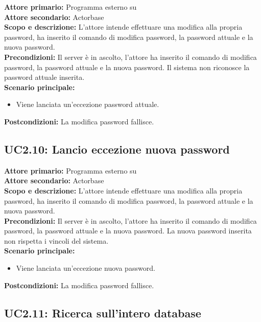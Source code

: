 \documentclass{scalatekids-article}
\begin{document}
\textbf{Attore primario:} Programma esterno su \\
\textbf{Attore secondario:} Actorbase\\
\textbf{Scopo e descrizione:}
L'attore intende effettuare una modifica alla propria password, ha inserito il comando di modifica password, la password attuale e la nuova password.\\
\textbf{Precondizioni:} Il server è in ascolto, l'attore ha inserito il comando di modifica password, la password attuale e la nuova password. Il sistema non riconosce la password attuale inserita.\\
\textbf{Scenario principale:}
\begin{itemize}
\item Viene lanciata un'eccezione password attuale.
\end{itemize}
\textbf{Postcondizioni:} La modifica password fallisce.

\subsection{UC2.10: Lancio eccezione nuova password}

\textbf{Attore primario:} Programma esterno su \\
\textbf{Attore secondario:} Actorbase\\
\textbf{Scopo e descrizione:}
L'attore intende effettuare una modifica alla propria password, ha inserito il comando di modifica password, la password attuale e la nuova password.\\
\textbf{Precondizioni:} Il server è in ascolto, l'attore ha inserito il comando di modifica password, la password attuale e la nuova password. La nuova password inserita non rispetta i vincoli del sistema.\\ %
\textbf{Scenario principale:}
\begin{itemize}
\item Viene lanciata un'eccezione nuova password.
\end{itemize}
\textbf{Postcondizioni:} La modifica password fallisce.

\subsection{UC2.11: Ricerca sull'intero database}
\end{document}
